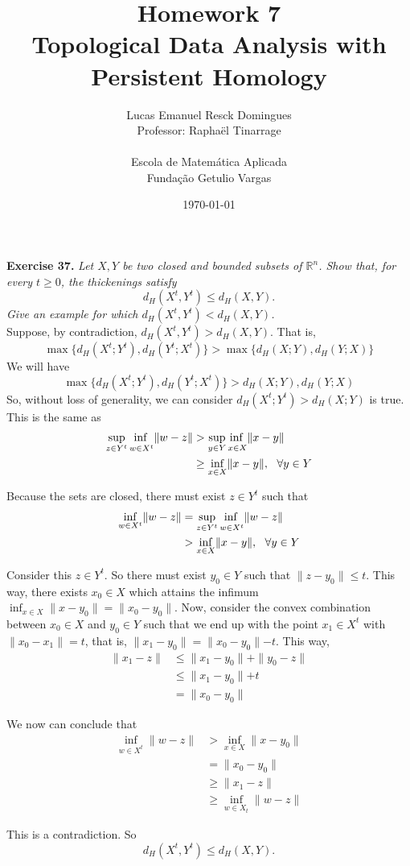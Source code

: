 \documentclass{article}
\title{Homework 7\\
    \large{Topological Data Analysis with Persistent Homology}}
\author{Lucas Emanuel Resck Domingues\\    
    Professor: Raphaël Tinarrage\\\\
    {Escola de Matemática Aplicada}\\
    {Fundação Getulio Vargas}}
\date{\today}
\begin{document}
    \maketitle

    \noindent \textbf{Exercise 37.} \textit{Let $X, Y$ be two closed and bounded subsets of $\mathbb{R}^n$.
    Show that, for every $t \ge 0$, the thickenings satisfy
    \[d_H(X^t, Y^t) \le d_H(X, Y).\]
    Give an example for which $d_H(X^t, Y^t) < d_H(X, Y)$.} \\

    Suppose, by contradiction, $d_H(X^t, Y^t) > d_H(X, Y)$.
    That is, \[\max\{d_H(X^t; Y^t), d_H(Y^t; X^t)\} > \max\{d_H(X; Y), d_H(Y; X)\}\]
    We will have \[\max\{d_H(X^t; Y^t), d_H(Y^t; X^t)\} > d_H(X; Y), d_H(Y; X)\]
    So, without loss of generality, we can consider $d_H(X^t; Y^t) > d_H(X; Y)$ is true.
    This is the same as
    \begin{align*}
        \adjustlimits\sup_{z \in Y^t} \inf_{w \in X^t} \lVert w - z \lVert &> \adjustlimits \sup_{y \in Y} \inf_{x \in X} \lVert x - y \lVert \\
        &\ge \inf_{x \in X} \lVert x - y \lVert, \ \ \forall y \in Y
    \end{align*}

    Because the sets are closed, there must exist $z \in Y^t$ such that 
    \begin{align*}
        \inf_{w \in X^t} \lVert w - z \lVert &= \adjustlimits\sup_{z \in Y^t} \inf_{w \in X^t} \lVert w - z \lVert \\
        &> \inf_{x \in X} \lVert x - y \lVert, \ \ \forall y \in Y
    \end{align*}

    Consider this $z \in Y^t$.
    So there must exist $y_0 \in Y$ such that $\lVert z - y_0 \lVert \le t$.
    This way, there exists $x_0 \in X$ which attains the infimum $\inf_{x \in X} \lVert x - y_0 \lVert = \lVert x_0 - y_0 \lVert$.
    Now, consider the convex combination between $x_0 \in X$ and $y_0 \in Y$ such that we end up with the point $x_1 \in X^t$ with $\lVert x_0 - x_1 \lVert = t$, that is, $\lVert x_1 - y_0 \lVert = \lVert x_0 - y_0 \lVert - t$.
    This way,
    \begin{align*}
        \lVert x_1 - z \lVert &\le \lVert x_1 - y_0 \lVert + \lVert y_0 - z \lVert \\
        &\le \lVert x_1 - y_0 \lVert + t \\
        &= \lVert x_0 - y_0 \lVert
    \end{align*}

    We now can conclude that
    \begin{align*}
        \inf_{w \in X^t} \lVert w - z \lVert &> \inf_{x \in X} \lVert x - y_0 \lVert \\
        &= \lVert x_0 - y_0 \lVert \\
        &\ge \lVert x_1 - z \lVert \\
        &\ge \inf_{w \in X_t} \lVert w - z \lVert
    \end{align*}

    This is a contradiction.
    So \[d_H(X^t, Y^t) \le d_H(X, Y).\]
\end{document}
